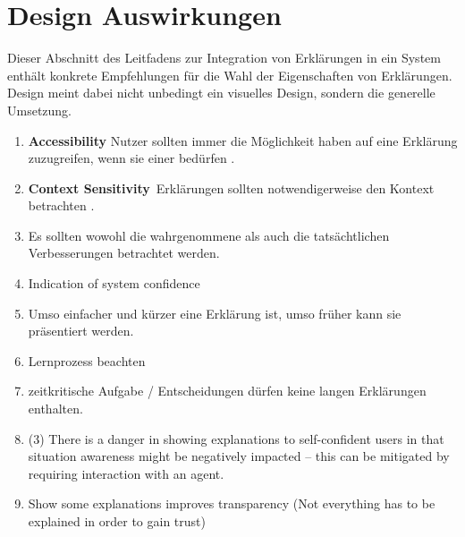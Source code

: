 \section{Design Auswirkungen}
\label{sec:model_design_implications}

Dieser Abschnitt des Leitfadens zur Integration von Erklärungen in ein System enthält konkrete Empfehlungen für die Wahl der Eigenschaften von Erklärungen. Design meint dabei nicht unbedingt ein visuelles Design, sondern die generelle Umsetzung.

\begin{enumerate}
    \item \textbf{Accessibility} Nutzer sollten immer die Möglichkeit haben auf eine Erklärung zuzugreifen, wenn sie einer bedürfen \cite{wiegand2019drive, chazette_end-users_nodate, wiegand_id_2020, weitz_you_2019}.
    \item \textbf{Context Sensitivity} Erklärungen sollten notwendigerweise den Kontext betrachten \cite{sato_context_nodate, rjoob_towards_2021,chazette_end-users_nodate}. %
    
    \item Es sollten wowohl die wahrgenommene als auch die tatsächtlichen Verbesserungen betrachtet werden. \cite{riveiro_thats_2021}
    \item Indication of system confidence \cite{wiegand_id_2020, golledge1999wayfinding}
    \item Umso einfacher und kürzer eine Erklärung ist, umso früher kann sie präsentiert werden. \cite{hleg2019policy, sovrano_modelling_2020}
    \item Lernprozess beachten \cite{wang_integration_2020}
    \item \cite{wiegand_id_2020, wiegand2019drive} zeitkritische Aufgabe / Entscheidungen dürfen keine langen Erklärungen enthalten.
    \item (3) There is a danger in showing explanations to self-confident users in that situation awareness might be negatively impacted – this can be mitigated by requiring interaction with an agent. \cite{schaffer_i_2019}
    \item Show some explanations improves transparency (Not everything has to be explained in order to gain trust) \cite{abdulrahman_belief-based_2019}
\end{enumerate}



